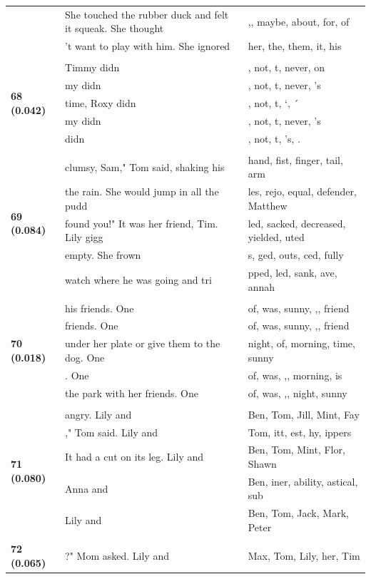 \documentclass{article}
\theoremstyle{plain}
\theoremstyle{definition}
\theoremstyle{remark}
\begin{document}
\begin{longtable}{|p{}|p{}|p{}|}
& She touched the rubber duck and felt it squeak.  She thought & ,,  maybe,  about,  for,  of \\
& 't want to play with him. She ignored & her,  the,  them,  it,  his \\
& & \\
\multirow{5}{*}{\textbf{68 (0.042)}} & Timmy didn & ,  not, t,  never, on \\
& my didn & ,  not, t,  never, 's \\
& time, Roxy didn & ,  not, t, `, ´ \\
& my didn & ,  not, t,  never, 's \\
& didn & ,  not, t, 's, . \\
& & \\
\multirow{5}{*}{\textbf{69 (0.084)}} & clumsy, Sam," Tom said, shaking his & hand,  fist,  finger,  tail,  arm \\
& the rain. She would jump in all the pudd & les,  rejo,  equal,  defender, Matthew \\
& found you!" It was her friend, Tim.   Lily gigg & led,  sacked,  decreased,  yielded, uted \\
& empty. She frown & s, ged, outs, ced, fully \\
& watch where he was going and tri & pped, led,  sank, ave, annah \\
& & \\
\multirow{5}{*}{\textbf{70 (0.018)}} & his friends. One & of,  was,  sunny, ,,  friend \\
& friends. One & of,  was,  sunny, ,,  friend \\
& under her plate or give them to the dog.  One & night,  of,  morning,  time,  sunny \\
& . One & of,  was, ,,  morning,  is \\
& the park with her friends. One & of,  was, ,,  night,  sunny \\
& & \\
\multirow{5}{*}{\textbf{71 (0.080)}} & angry.  Lily and & Ben,  Tom,  Jill,  Mint,  Fay \\
& ," Tom said.  Lily and & Tom, itt, est, hy, ippers \\
& It had a cut on its leg. Lily and & Ben,  Tom,  Mint,  Flor,  Shawn \\
& Anna and & Ben, iner, ability, astical, sub \\
& Lily and & Ben,  Tom,  Jack,  Mark,  Peter \\
& & \\
\multirow{5}{*}{\textbf{72 (0.065)}} & ?" Mom asked.  Lily and & Max,  Tom,  Lily,  her,  Tim \\

\end{longtable}
\end{document}
